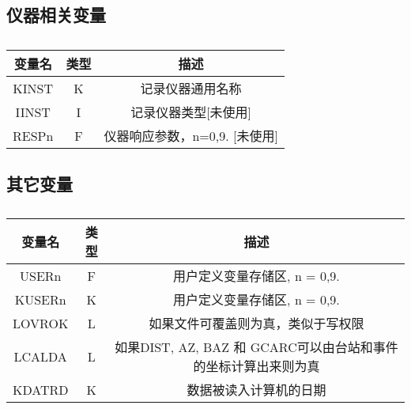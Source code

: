 \subsection{仪器相关变量}
\begin{table}[H]
\centering
\caption{}
\label{}
\begin{tabular}{ccc}
    \toprule
	变量名	&	类型	&	描述\\
    \midrule
    KINST   &   K       &   记录仪器通用名称    \\                               
    IINST   &   I       &   记录仪器类型[未使用]\\                               
    RESPn   &   F       &   仪器响应参数，n=0,9. [未使用]\\
    \bottomrule
\end{tabular}
\end{table}

\subsection{其它变量}
\begin{table}[H]
\centering
\caption{}
\label{}
\begin{tabular}{ccc}
    \toprule
	变量名	&	类型	&	描述\\
    \midrule
    USERn   &   F       &   用户定义变量存储区, n = 0,9.\\
    KUSERn  &   K       &   用户定义变量存储区,  n = 0,9.\\     
    LOVROK  &   L       &   如果文件可覆盖则为真，类似于写权限  \\  
    LCALDA  &   L       &   如果DIST, AZ, BAZ 和 GCARC可以由台站和事件的坐标计算出来则为真\\
    KDATRD  &   K       &   数据被读入计算机的日期\\ 
    \bottomrule
\end{tabular}
\end{table}
